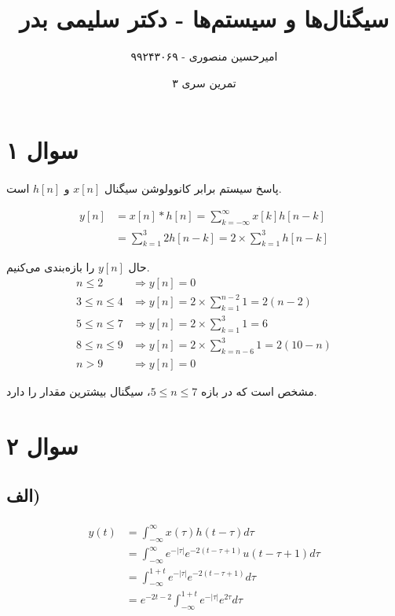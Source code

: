 \documentclass{article}
\title{سیگنال‌ها و سیستم‌ها - دکتر سلیمی بدر}
\author{امیرحسین منصوری - ۹۹۲۴۳۰۶۹}
\date{تمرین سری ۳}
\begin{document}
	\maketitle

	\section*{سوال ۱}
	\paragraph*{}

	پاسخ سیستم برابر کانوولوشن سیگنال
	$x[n]$
	و
	$h[n]$
	است.

	\begin{align*}
		y[n] &= x[n] * h[n]
		= \sum_{k=-\infty}^{\infty} x[k]h[n-k] \\
		&= \sum_{k=1}^{3} 2 h[n-k] = 2 \times \sum_{k=1}^{3} h[n-k]
	\end{align*}

	حال
	$y[n]$
	را بازه‌بندی می‌کنیم.
	\begin{align*}
		n \le 2 &\Rightarrow y[n] = 0 \\
		3 \le n \le 4 &\Rightarrow y[n] = 2 \times \sum_{k=1}^{n-2} 1 = 2(n-2) \\
		5 \le n \le 7 &\Rightarrow y[n] = 2 \times \sum_{k=1}^{3} 1 = 6 \\
		8 \le n \le 9 &\Rightarrow y[n] = 2 \times \sum_{k=n-6}^{3} 1 = 2(10-n) \\
		n > 9 &\Rightarrow y[n] = 0
	\end{align*}

	مشخص است که در بازه
	$5 \le n \le 7$،
	سیگنال بیشترین مقدار را دارد.

	\section*{سوال ۲}
	\subsection*{الف)}
	\paragraph*{}

	\begin{align*}
		y(t) &= \int_{-\infty}^{\infty} x(\tau) h(t-\tau) d \tau \\
		&= \int_{-\infty}^{\infty} e^{-|\tau|} e^{-2(t-\tau+1)} u(t-\tau+1) d \tau \\
		&= \int_{-\infty}^{1+t} e^{-|\tau|} e^{-2(t-\tau+1)} d \tau \\
		&= e^{-2t-2} \int_{-\infty}^{1+t} e^{-|\tau|} e^{2\tau} d \tau \\
	\end{align*}
\end{document}

